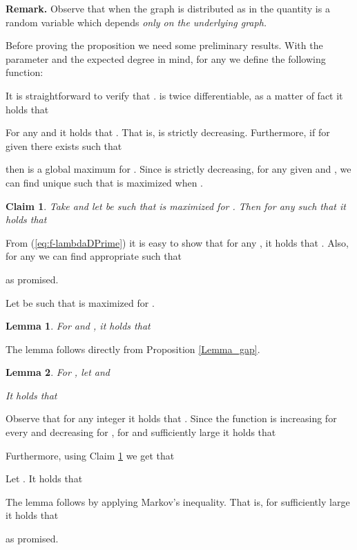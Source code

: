 \documentclass[a4paper,10pt]{article}
\makeatletter
\newtheorem{claim}{Claim}\renewcommand{\theclaim}{\arabic{claim}}
\newtheorem{lemma}{Lemma}\renewcommand{\thelemma}{\arabic{lemma}}
\newenvironment{proof}{\noindent{\bf Proof\@:}}{\hfill \\}
\makeatother
\begin{document}
\noindent
{\bf Remark.}
Observe that when the graph  is distributed as in  the
quantity  is a random variable which depends {\em only on the
underlying graph.} 
\\ \vspace{-.3cm}

\noindent
Before proving the proposition we need some preliminary results.
With the parameter  and the expected degree  in mind, 
for any  we define the following function:

It is straightforward to verify that .
 is twice differentiable, as a matter of fact it holds that

For any  and  it holds that . 
That is,  is strictly decreasing. Furthermore, if 
for given  there exists  such that 

then  is a global maximum for .
Since  is strictly decreasing, for any given
 and , we can find unique  such 
that  is maximized when .


\begin{claim}\label{claim:UnlikeIS}
Take  and let  be such that 
is maximized for . Then for any  such that 
it holds that

\end{claim}
\begin{proof}
From (\ref{eq:f-lambdaDPrime}) it is easy to show that for any ,
it holds that . Also, for any  we can find 
appropriate   such that 

as promised.
\end{proof}

\noindent
Let  be such that  is maximized for 
. 


\begin{lemma}\label{lemma:MassOfMaximum}
For  and , it holds that

\end{lemma}
\begin{proof}
The lemma follows directly from Proposition  \ref{Lemma_gap}.
\end{proof}



\begin{lemma}\label{lemma:AlmostMostLikelyIS}
For ,  let 
and
 
It holds that

\end{lemma}
\begin{proof}
Observe that for any integer  it holds that
. 
Since the function  is increasing for every 
 and decreasing for , for 
 and sufficiently large  it holds  that

Furthermore, using Claim \ref{claim:UnlikeIS} we get that

Let . 
It holds that

The lemma follows by applying Markov's inequality. That is,
for sufficiently large  it holds that

as promised.
\end{proof}
\end{document}
